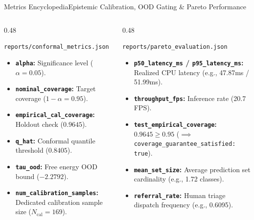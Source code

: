 \begin{frame}{Metrics Encyclopedia}{Epistemic Calibration, OOD Gating \& Pareto Performance}
    \begin{columns}[T]
        \begin{column}{0.48\textwidth}
            \begin{block}{\texttt{reports/conformal\_metrics.json}}
                \begin{itemize}\scriptsize
                    \item \textbf{\texttt{alpha}:} Significance level ($\alpha = 0.05$).
                    \item \textbf{\texttt{nominal\_coverage}:} Target coverage ($1 - \alpha = 0.95$).
                    \item \textbf{\texttt{empirical\_cal\_coverage}:} Holdout check ($0.9645$).
                    \item \textbf{\texttt{q\_hat}:} Conformal quantile threshold ($0.8405$).
                    \item \textbf{\texttt{tau\_ood}:} Free energy OOD bound ($-2.2792$).
                    \item \textbf{\texttt{num\_calibration\_samples}:} Dedicated calibration sample size ($N_{\text{cal}} = 169$).
                \end{itemize}
            \end{block}
        \end{column}
        \begin{column}{0.48\textwidth}
            \begin{block}{\texttt{reports/pareto\_evaluation.json}}
                \begin{itemize}\scriptsize
                    \item \textbf{\texttt{p50\_latency\_ms} / \texttt{p95\_latency\_ms}:} Realized CPU latency (e.g., 47.87ms / 51.99ms).
                    \item \textbf{\texttt{throughput\_fps}:} Inference rate (20.7 FPS).
                    \item \textbf{\texttt{test\_empirical\_coverage}:} $0.9645 \ge 0.95$ ($\implies$ \texttt{coverage\_guarantee\_satisfied: true}).
                    \item \textbf{\texttt{mean\_set\_size}:} Average prediction set cardinality (e.g., 1.72 classes).
                    \item \textbf{\texttt{referral\_rate}:} Human triage dispatch frequency (e.g., 0.6095).
                \end{itemize}
            \end{block}
        \end{column}
    \end{columns}



\end{frame}

